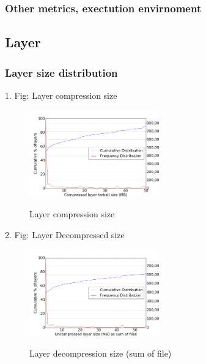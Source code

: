 \subsubsection{Other metrics, exectution envirnoment}

\subsection{Layer}

\subsubsection{Layer size distribution}

1. Fig: Layer compression size

\begin{figure}
	\centering
	\includegraphics[width=0.5\textwidth]{graphs/Compressed_layer_tarball_size_(MB).png}\\
	\caption{Layer compression size}\label{fig_image_size_compression}
\end{figure}

2. Fig: Layer Decompressed size

\begin{figure}
	\centering
	\includegraphics[width=0.5\textwidth]{graphs/Uncompressed_layer_size_(MB)_as_sum_of_files.png}\\
	\caption{Layer decompression size (sum of file)}\label{fig_image_size_compression}
\end{figure}

